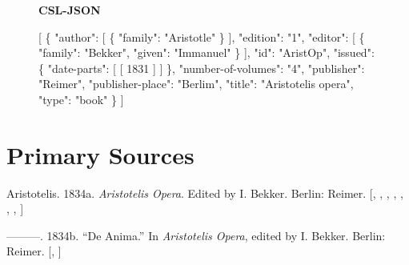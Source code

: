 \documentclass[
  12pt,
  a4paper,
  oneside,
  titlepage,
  toclink=all,
  toc=bibliography]{scrbook}
\newenvironment{Shaded}{\begin{snugshade}}{\end{snugshade}}
\newcommand{\DataTypeTok}[1]{\textcolor[rgb]{0.68,0.00,0.00}{#1}}
\newcommand{\DecValTok}[1]{\textcolor[rgb]{0.68,0.00,0.00}{#1}}
\newcommand{\FunctionTok}[1]{\textcolor[rgb]{0.28,0.35,0.67}{#1}}
\newcommand{\OtherTok}[1]{\textcolor[rgb]{0.00,0.23,0.31}{#1}}
\newcommand{\StringTok}[1]{\textcolor[rgb]{0.13,0.47,0.30}{#1}}
\newlength{\cslhangindent}
\newlength{\cslentryspacingunit} %
\newenvironment{CSLReferences}[2] %
 {%
  \setlength{\parindent}{0pt}
  \ifodd #1
  \let\oldpar\par
  \def\par{\hangindent=\cslhangindent\oldpar}
  \fi
  \setlength{\parskip}{#2\cslentryspacingunit}
 }%
 {}
\theoremstyle{definition}
\theoremstyle{plain}
\theoremstyle{plain}
\theoremstyle{plain}
\theoremstyle{plain}
\theoremstyle{definition}
\theoremstyle{definition}
\theoremstyle{plain}
\theoremstyle{remark}
\begin{document}
\begin{figure}
\textbf{CSL-JSON}

\begin{Shaded}
\begin{Highlighting}[numbers=left,,]
\OtherTok{[}
  \FunctionTok{\{}
    \DataTypeTok{"author"}\FunctionTok{:} \OtherTok{[}
      \FunctionTok{\{}
        \DataTypeTok{"family"}\FunctionTok{:} \StringTok{"Aristotle"}
      \FunctionTok{\}}
    \OtherTok{]}\FunctionTok{,}
    \DataTypeTok{"edition"}\FunctionTok{:} \StringTok{"1"}\FunctionTok{,}
    \DataTypeTok{"editor"}\FunctionTok{:} \OtherTok{[}
      \FunctionTok{\{}
        \DataTypeTok{"family"}\FunctionTok{:} \StringTok{"Bekker"}\FunctionTok{,}
        \DataTypeTok{"given"}\FunctionTok{:} \StringTok{"Immanuel"}
      \FunctionTok{\}}
    \OtherTok{]}\FunctionTok{,}
    \DataTypeTok{"id"}\FunctionTok{:} \StringTok{"AristOp"}\FunctionTok{,}
    \DataTypeTok{"issued"}\FunctionTok{:} \FunctionTok{\{}
      \DataTypeTok{"date{-}parts"}\FunctionTok{:} \OtherTok{[}
        \OtherTok{[}
          \DecValTok{1831}
        \OtherTok{]}
      \OtherTok{]}
    \FunctionTok{\},}
    \DataTypeTok{"number{-}of{-}volumes"}\FunctionTok{:} \StringTok{"4"}\FunctionTok{,}
    \DataTypeTok{"publisher"}\FunctionTok{:} \StringTok{"Reimer"}\FunctionTok{,}
    \DataTypeTok{"publisher{-}place"}\FunctionTok{:} \StringTok{"Berlim"}\FunctionTok{,}
    \DataTypeTok{"title"}\FunctionTok{:} \StringTok{"Aristotelis opera"}\FunctionTok{,}
    \DataTypeTok{"type"}\FunctionTok{:} \StringTok{"book"}
  \FunctionTok{\}}
\OtherTok{]}
\end{Highlighting}
\end{Shaded}

\end{figure}

\hypertarget{sec-scriv56}{%
\chapter{Primary Sources}\label{sec-scriv56}}

\hypertarget{refs_scriv56}{}
\begin{CSLReferences}{1}{0}
\leavevmode{}%
Aristotelis. 1834a. \emph{Aristotelis Opera}. Edited by I. Bekker.
Berlin: Reimer. {[},
\protect\hyperlink{cite_94}{\pageref{cite_94}},
\protect\hyperlink{cite_95}{\pageref{cite_95}},
\protect\hyperlink{cite_96}{\pageref{cite_96}},
\protect\hyperlink{cite_97}{\pageref{cite_97}},
\protect\hyperlink{cite_98}{\pageref{cite_98}},
\protect\hyperlink{cite_99}{\pageref{cite_99}},
\protect\hyperlink{cite_101}{\pageref{cite_101}}{]}

\leavevmode{}%
---------. 1834b. {``De Anima.''} In \emph{Aristotelis Opera}, edited by
I. Bekker. Berlin: Reimer. {[},
\protect\hyperlink{cite_100}{\pageref{cite_100}}{]}

\end{CSLReferences}
\end{document}
